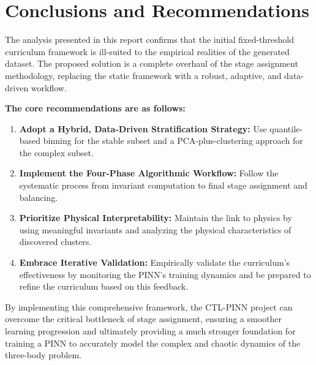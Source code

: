 \part{Conclusions and Recommendations}

The analysis presented in this report confirms that the initial fixed-threshold curriculum framework is ill-suited to the empirical realities of the generated dataset. The proposed solution is a complete overhaul of the stage assignment methodology, replacing the static framework with a robust, adaptive, and data-driven workflow.

\textbf{The core recommendations are as follows:}
\begin{enumerate}
    \item \textbf{Adopt a Hybrid, Data-Driven Stratification Strategy:} Use quantile-based binning for the stable subset and a PCA-plus-clustering approach for the complex subset.
    \item \textbf{Implement the Four-Phase Algorithmic Workflow:} Follow the systematic process from invariant computation to final stage assignment and balancing.
    \item \textbf{Prioritize Physical Interpretability:} Maintain the link to physics by using meaningful invariants and analyzing the physical characteristics of discovered clusters.
    \item \textbf{Embrace Iterative Validation:} Empirically validate the curriculum's effectiveness by monitoring the PINN's training dynamics and be prepared to refine the curriculum based on this feedback.
\end{enumerate}
By implementing this comprehensive framework, the CTL-PINN project can overcome the critical bottleneck of stage assignment, ensuring a smoother learning progression and ultimately providing a much stronger foundation for training a PINN to accurately model the complex and chaotic dynamics of the three-body problem.
